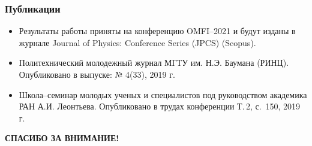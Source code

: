 \documentclass[compress,professionalfont]{beamer}
\begin{document}
\begin{frame}
\frametitle{Публикации}

\begin{itemize}
\item Результаты работы приняты на конференцию OMFI--2021 и будут изданы в журнале Journal of Physics: Conference Series (JPCS) (Scopus).
\item Политехнический молодежный журнал МГТУ им. Н.Э. Баумана (РИНЦ). Опубликовано в выпуске: № 4(33), 2019 г.
\item Школа--семинар молодых ученых и специалистов под руководством академика РАН А.И. Леонтьева.
Опубликовано в трудах конференции Т.\,2, с.~150, 2019 г.
\end{itemize}
\end{frame}

\begin{frame}

\begin{center}
\Large\bf СПАСИБО ЗА ВНИМАНИЕ!
\end{center}

\end{frame}
\end{document}
